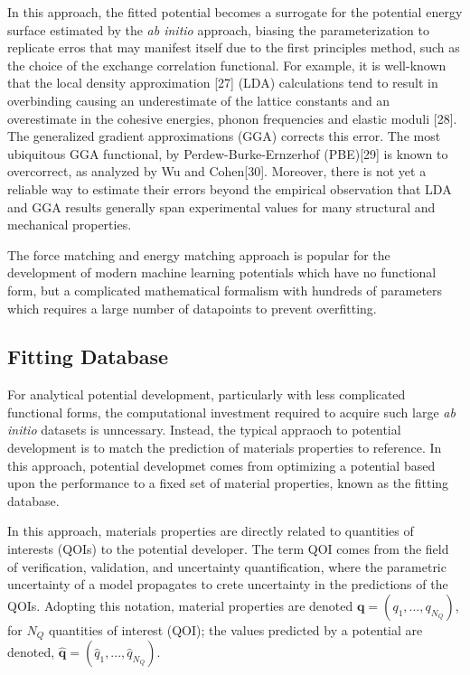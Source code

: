In this approach, the fitted potential becomes a surrogate for the potential energy surface estimated by the \emph{ab initio} approach, biasing the parameterization to replicate erros that may manifest itself due to the first principles method, such as the choice of the exchange correlation functional.  For example, it is well-known that the local density approximation [27] (LDA) calculations tend to result in overbinding causing an underestimate of the lattice constants and an overestimate in the cohesive energies, phonon frequencies and elastic moduli [28].  The generalized gradient approximations (GGA) corrects this error.  The most ubiquitous GGA functional, by Perdew-Burke-Ernzerhof (PBE)[29] is known to overcorrect, as analyzed by Wu and Cohen[30].  Moreover, there is not yet a reliable way to estimate their errors beyond the empirical observation that LDA and GGA results generally span experimental values for many structural and mechanical properties.

The force matching and energy matching approach is popular for the development of modern machine learning potentials which have no functional form, but a complicated mathematical formalism with hundreds of parameters\cite{behler2016_ml_pot} which requires a large number of datapoints to prevent overfitting\cite{wood2018_snap}.

\subsection{Fitting Database}

For analytical potential development, particularly with less complicated functional forms, the computational investment required to acquire such large \emph{ab initio} datasets is unncessary.  Instead, the typical appraoch to potential development is to match the prediction of materials properties to reference.  In this approach,  potential developmet comes from optimizing a potential based upon the performance to a fixed set of material properties, known as the fitting database.

In this approach, materials properties are directly related to quantities of interests (QOIs) to the potential developer.  The term QOI comes from the field of verification, validation, and uncertainty quantification, where the parametric uncertainty of a model propagates to crete uncertainty in the predictions of the QOIs.  Adopting this notation, material properties are denoted  $\bm{q} = ( q_{1},...,q_{N_Q} )$, for $N_Q$ quantities of interest (QOI); the values predicted by a potential are denoted, $\hat{\bm{q}}= (\hat{q}_{1},...,\hat{q}_{N_Q})$.

